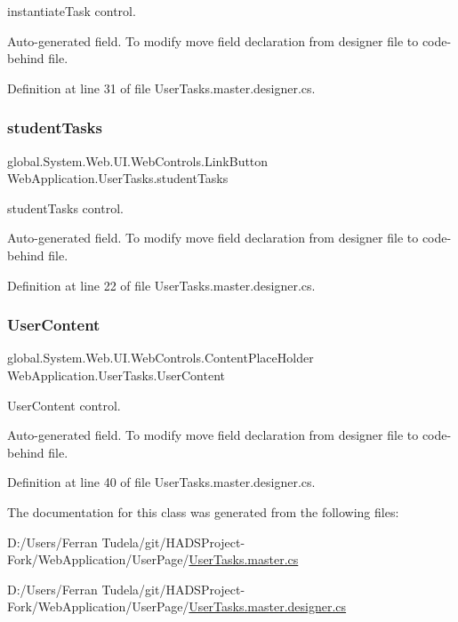 instantiate\+Task control. 

Auto-\/generated field. To modify move field declaration from designer file to code-\/behind file. 

Definition at line 31 of file User\+Tasks.\+master.\+designer.\+cs.

\mbox{\label{classWebApplication_1_1UserTasks_aaa0fb97811010af96c39e8df2fff1ce1}} 
\subsubsection{\texorpdfstring{studentTasks}{studentTasks}}
{\footnotesize\ttfamily global.\+System.\+Web.\+U\+I.\+Web\+Controls.\+Link\+Button Web\+Application.\+User\+Tasks.\+student\+Tasks\hspace{0.3cm}{\ttfamily [protected]}}



student\+Tasks control. 

Auto-\/generated field. To modify move field declaration from designer file to code-\/behind file. 

Definition at line 22 of file User\+Tasks.\+master.\+designer.\+cs.

\mbox{\label{classWebApplication_1_1UserTasks_aa929c7e9c76317af65221bfb4ead895d}} 
\subsubsection{\texorpdfstring{UserContent}{UserContent}}
{\footnotesize\ttfamily global.\+System.\+Web.\+U\+I.\+Web\+Controls.\+Content\+Place\+Holder Web\+Application.\+User\+Tasks.\+User\+Content\hspace{0.3cm}{\ttfamily [protected]}}



User\+Content control. 

Auto-\/generated field. To modify move field declaration from designer file to code-\/behind file. 

Definition at line 40 of file User\+Tasks.\+master.\+designer.\+cs.



The documentation for this class was generated from the following files\+:\begin{DoxyCompactItemize}
\item 
D\+:/\+Users/\+Ferran Tudela/git/\+H\+A\+D\+S\+Project-\/\+Fork/\+Web\+Application/\+User\+Page/\mbox{\hyperlink{UserTasks_8master_8cs}{User\+Tasks.\+master.\+cs}}\item 
D\+:/\+Users/\+Ferran Tudela/git/\+H\+A\+D\+S\+Project-\/\+Fork/\+Web\+Application/\+User\+Page/\mbox{\hyperlink{UserTasks_8master_8designer_8cs}{User\+Tasks.\+master.\+designer.\+cs}}\end{DoxyCompactItemize}
